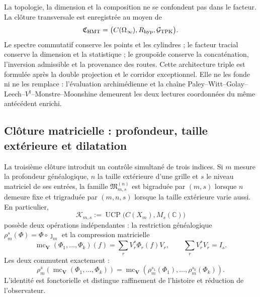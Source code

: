 La topologie, la dimension et la composition ne se confondent pas dans le facteur. La clôture
transversale est enregistrée au moyen de
\[
 \mathfrak C_{\rm HMT}
 =\bigl(C(\Omega_\infty),R_{\rm hyp},\mathcal G_{\rm TPK}\bigr).
\]
Le spectre commutatif conserve les points et les cylindres ; le facteur tracial conserve
la dimension et la statistique ; le groupoïde conserve la concaténation, l'inversion
admissible et la provenance des routes. Cette architecture triple est formulée après
la double projection et le corridor exceptionnel. Elle ne les fonde ni ne les
remplace : l'évaluation archimédienne et la chaîne
Paley--Witt--Golay--Leech--\(V^\natural\)--Monstre--Moonshine demeurent
les deux lectures coordonnées du même antécédent enrichi.

\subsection*{Clôture matricielle : profondeur, taille extérieure et dilatation}

La troisième clôture introduit un contrôle simultané de trois indices. Si
\(m\) mesure la profondeur généalogique, \(n\) la taille extérieure d'une grille
et \(s\) le niveau matriciel de ses entrées, la famille
\(\mathfrak M_{m,s}^{(n)}\) est bigraduée par \((m,s)\) lorsque \(n\) demeure
fixe et trigraduée par \((m,n,s)\) lorsque la taille extérieure varie aussi.
En particulier,
\[
 \mathcal K_{m,s}
 :=\operatorname{UCP}\!\bigl(C(X_m),M_s(\mathbb C)\bigr)
\]
possède deux opérations indépendantes : la restriction généalogique
\(\rho_m^s(\Phi)=\Phi\circ\jmath_m\) et la compression matricielle
\[
 \operatorname{mc}_{\boldsymbol V}(\Phi_1,\ldots,\Phi_k)(f)
 =\sum_rV_r^*\Phi_r(f)V_r,
 \qquad \sum_rV_r^*V_r=I_s.
\]
Les deux commutent exactement :
\[
 \rho_m^s\!\left(\operatorname{mc}_{\boldsymbol V}(\Phi_1,\ldots,\Phi_k)\right)
 =\operatorname{mc}_{\boldsymbol V}\!\left(
   \rho_m^{s_1}(\Phi_1),\ldots,\rho_m^{s_k}(\Phi_k)\right).
\]
L'identité est fonctorielle et distingue raffinement de l'histoire et réduction
de l'observateur.

